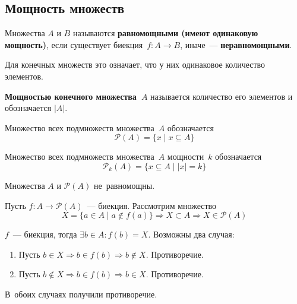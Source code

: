 \subsection{Мощность множеств}
Множества $A$ и $B$ называются \textbf{равномощными (имеют одинаковую мощность)}, если существует биекция~$f \colon A \to B$, иначе~--- \textbf{неравномощными}.

Для конечных множеств это означает, что у них одинаковое количество элементов.

 \textbf{Мощностью конечного множества~$A$} называется количество его элементов и обозначается $|A|$.

Множество всех подмножеств множества~$A$ обозначается
\begin{equation*}
\mathcal P(A) = \{ x \mid x \subseteq A \}
\end{equation*}

Множество всех подмножеств множества~$A$ мощности~$k$ обозначается
\begin{equation*}
\mathcal P_k(A) = \{ x \subseteq A \mid |x| = k \}
\end{equation*}

\begin{theorem}[Кантора]
Множества $A$ и $\mathcal P(A)$ не~равномощны.
\end{theorem}
\begin{proofcontra}
Пусть $f \colon A \to \mathcal P(A)$~--- биекция. Рассмотрим множество
\begin{equation*}
X = \{ a \in A \mid a \notin f(a) \} \Rightarrow X \subset A \Rightarrow X \in \mathcal P(A)
\end{equation*}

$f$~--- биекция, тогда $\exists b \in A \colon f(b) = X$.
Возможны два случая:
\begin{enumerate}
	\item Пусть $b \in X \Rightarrow b \in f(b) \Rightarrow b \notin X$.
	Противоречие.
	\item Пусть $b \notin X \Rightarrow b \in f(b) \Rightarrow b \in X$.
	Противоречие.
\end{enumerate}

В~обоих случаях получили противоречие.
\end{proofcontra}

